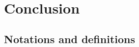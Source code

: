 \documentclass[preprint,10pt]{sigplanconf}
\begin{document}
\section{Conclusion} \label{sec:conclusions}












\begin{appendix}
	
	\section{Notations and definitions} \label{sec:app1}


\end{appendix}
\end{document}
